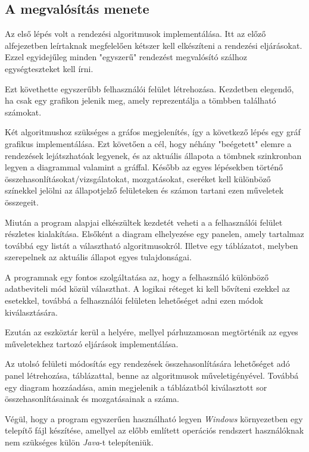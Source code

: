 \documentclass{elteikthesis}
\begin{document}
\subsection{A megvalósítás menete}
Az első lépés volt a rendezési algoritmusok implementálása. Itt az előző alfejezetben leírtaknak megfelelően kétszer kell elkészíteni a rendezési eljárásokat. Ezzel egyidejűleg minden "egyszerű" rendezést megvalósító szálhoz egységteszteket kell írni.\par
Ezt követhette egyszerűbb felhasználói felület létrehozása. Kezdetben elegendő, ha csak egy grafikon jelenik meg, amely reprezentálja a tömbben található számokat.\par
Két algoritmushoz szükséges a gráfos megjelenítés, így a következő lépés egy gráf grafikus implementálása.
Ezt követően a cél, hogy néhány "beégetett" elemre a rendezések lejátszhatóak legyenek, és az aktuális állapota a tömbnek szinkronban legyen a diagrammal valamint a gráffal. Később az egyes lépésekben történő összehasonlításokat/vizsgálatokat, mozgatásokat, cseréket kell különböző színekkel jelölni az állapotjelző felületeken és számon tartani ezen műveletek összegeit.\par
Miután a program alapjai elkészültek kezdetét veheti a a felhasználói felület részletes kialakítása. Elsőként a diagram elhelyezése egy panelen, amely tartalmaz továbbá egy listát a választható algoritmusokról. Illetve egy táblázatot, melyben szerepelnek az aktuális állapot egyes tulajdonságai.\par
A programnak egy fontos szolgáltatása az, hogy a felhasználó különböző adatbeviteli mód közül választhat. A logikai réteget ki kell bővíteni ezekkel az esetekkel, továbbá a felhasználói felületen lehetőséget adni ezen módok kiválasztására.\par
Ezután az eszköztár kerül a helyére, mellyel párhuzamosan megtörténik az egyes műveletekhez tartozó eljárások implementálása.\par
Az utolsó felületi módosítás egy rendezések összehasonlítására lehetőséget adó panel létrehozása, táblázattal, benne az algoritmusok műveletigényével. Továbbá egy diagram hozzáadása, amin megjelenik a táblázatból kiválasztott sor összehasonlításainak és mozgatásainak a száma.\par
Végül, hogy a program egyszerűen használható legyen \emph{Windows} környezetben egy telepítő fájl készítése, amellyel az előbb említett operációs rendszert használóknak nem szükséges külön \emph{Java}-t telepíteniük.
\end{document}
